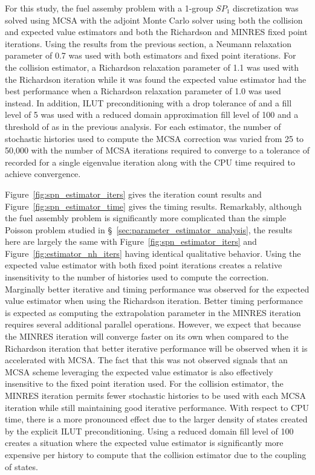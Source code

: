 For this study, the fuel assemby problem with a 1-group $SP_1$
discretization was solved using MCSA with the adjoint Monte Carlo
solver using both the collision and expected value estimators and both
the Richardson and MINRES fixed point iterations. Using the results
from the previous section, a Neumann relaxation parameter of 0.7 was
used with both estimators and fixed point iterations. For the
collision estimator, a Richardson relaxation parameter of 1.1 was used
with the Richardson iteration while it was found the expected value
estimator had the best performance when a Richardson relaxation
parameter of 1.0 was used instead. In addition, ILUT preconditioning
with a drop tolerance of  and a fill level of 5 was used
with a reduced domain approximation fill level of 100 and a threshold
of  as in the previous analysis. For each estimator, the
number of stochastic histories used to compute the MCSA correction was
varied from 25 to 50,000 with the number of MCSA iterations required
to converge to a tolerance of  recorded for a single
eigenvalue iteration along with the CPU time required to achieve
convergence.

Figure~\ref{fig:spn_estimator_iters} gives the iteration count results
and Figure~\ref{fig:spn_estimator_time} gives the timing
results. Remarkably, although the fuel assembly problem is
significantly more complicated than the simple Poisson problem studied
in \S~\ref{sec:parameter_estimator_analysis}, the results here are
largely the same with Figure~\ref{fig:spn_estimator_iters} and
Figure~\ref{fig:estimator_nh_iters} having identical qualitative
behavior. Using the expected value estimator with both fixed point
iterations creates a relative insensitivity to the number of histories
used to compute the correction. Marginally better iterative and timing
performance was observed for the expected value estimator when using
the Richardson iteration. Better timing performance is expected as
computing the extrapolation parameter in the MINRES iteration requires
several additional parallel operations. However, we expect that
because the MINRES iteration will converge faster on its own when
compared to the Richardson iteration that better iterative performance
will be observed when it is accelerated with MCSA. The fact that this
was not observed signals that an MCSA scheme leveraging the expected
value estimator is also effectively insensitive to the fixed point
iteration used. For the collision estimator, the MINRES iteration
permits fewer stochastic histories to be used with each MCSA iteration
while still maintaining good iterative performance. With respect to
CPU time, there is a more pronounced effect due to the larger density
of states created by the explicit ILUT preconditioning. Using a
reduced domain fill level of 100 creates a situation where the
expected value estimator is significantly more expensive per history
to compute that the collision estimator due to the coupling of states.

